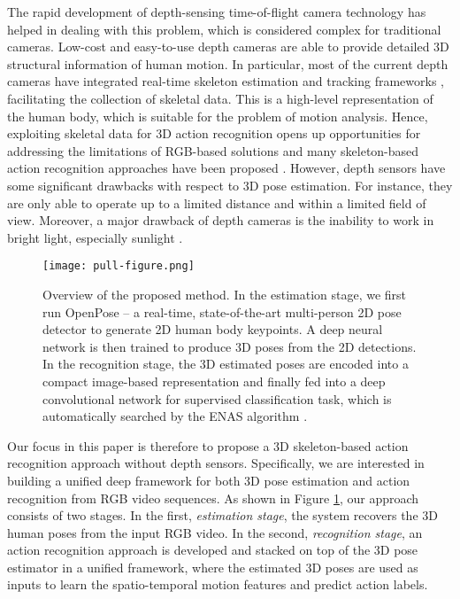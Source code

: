 \documentclass{bmvc2k}
\begin{document}
The rapid development of depth-sensing time-of-flight camera technology has helped in dealing with this problem, which is considered complex for traditional cameras. Low-cost and easy-to-use depth cameras are able to provide detailed 3D structural information of human motion. In particular, most of the current depth cameras have integrated real-time skeleton estimation and tracking frameworks \cite{ye2014real}, facilitating the collection of skeletal data. This is a high-level representation of the human body, which is suitable for the problem of motion analysis.  Hence, exploiting skeletal data for 3D action recognition opens up opportunities for addressing the limitations of RGB-based solutions and many skeleton-based action recognition approaches have been proposed \cite{Wang2012MiningAE,xia2012view,chaudhry2013bio,Vemulapalli2014HumanAR,ding2016profile}. However, depth sensors have some significant drawbacks with respect to 3D pose estimation. For instance, they are only able to operate up to a limited distance and within a limited field of view. Moreover, a major drawback of depth cameras is the inability to work in bright light, especially sunlight \cite{zhang2012microsoft}.
\begin{figure}[h]
\begin{center}
 \texttt{[image: pull-figure.png]}
 \vspace*{-0.4cm}
\end{center}
\caption{Overview of the proposed method. In the estimation stage, we first run OpenPose \cite{cao2017realtime} -- a real-time, state-of-the-art multi-person 2D pose detector to generate 2D human body keypoints. A deep neural network is then trained to produce 3D poses from the 2D detections. In the recognition stage, the 3D estimated poses are encoded into a compact image-based representation and finally fed into a deep convolutional network for supervised classification task, which is automatically searched by the ENAS algorithm \cite{pmlr-v80-pham18a}.}
\label{fig:1}
\end{figure}
Our focus in this paper is therefore to propose a 3D skeleton-based action recognition approach without depth sensors. Specifically, we are interested in building a unified deep framework for both 3D pose estimation and action recognition from RGB video sequences. As shown in Figure \ref{fig:1}, our approach consists of two stages. In the first, \textit{estimation stage}, the system recovers the 3D human poses from the input RGB video. In the second, \textit{recognition stage}, an action recognition approach is developed and stacked on top of the 3D pose estimator in a unified framework, where the estimated 3D poses are used as inputs to learn the spatio-temporal motion features and predict action labels. 
\end{document}
